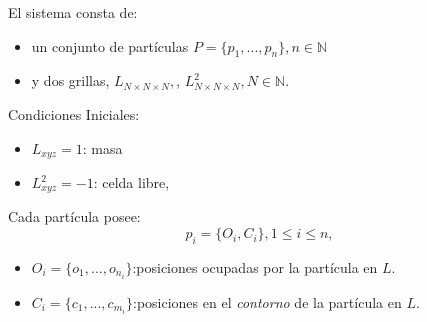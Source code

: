 \documentclass[spanish,unknownkeysallowed]{beamer}
\begin{document}
\begin{frame}
El sistema consta de:
\begin{itemize}
\item un conjunto de partículas $P = \{p_{1}, ... , p_{n}\}, n  \in \mathbb{N}$
\item y dos grillas, $L_{N\times N \times N},$, $L^{2}_{N\times N \times N}, N \in \mathbb{N}.$
\end{itemize}

Condiciones Iniciales:
\begin{itemize}
\item $L_{xyz}=1$: masa
\item $L^{2}_{xyz}=-1$: celda libre,
\end{itemize}

Cada partícula posee:
\begin{equation*}
  p_{i} = \{O_{i}, C_{i}\}, 1 \le i \le n,
\end{equation*}

\begin{itemize}
\item $O_{i} = \{o_{1}, ... , o_{n_{i}}\}$:posiciones ocupadas por la part\'icula en $L$.

\item $C_{i} = \{c_{1}, ... , c_{m_{i}}\}$:posiciones en el {\em contorno} de la part\'icula en $L$.
\end{itemize}

\end{frame}


\end{document}
